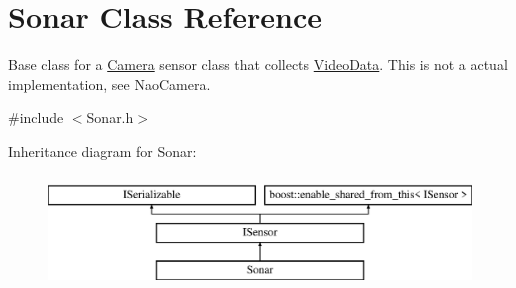 \hypertarget{class_sonar}{}\section{Sonar Class Reference}
\label{class_sonar}


Base class for a \hyperlink{class_camera}{Camera} sensor class that collects \hyperlink{class_video_data}{Video\+Data}. This is not a actual implementation, see Nao\+Camera.  




{\ttfamily \#include $<$Sonar.\+h$>$}

Inheritance diagram for Sonar\+:\begin{figure}[H]
\begin{center}
\leavevmode
\includegraphics[height=3.000000cm]{class_sonar}
\end{center}
\end{figure}
